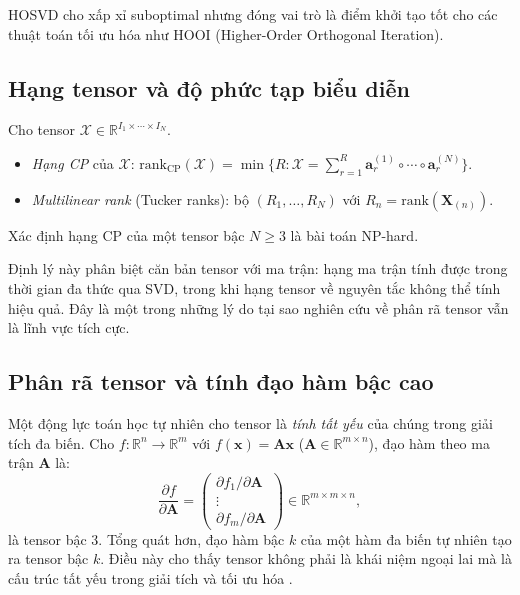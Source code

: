 HOSVD cho xấp xỉ suboptimal nhưng đóng vai trò là điểm khởi tạo tốt cho các thuật toán tối ưu hóa như HOOI (Higher-Order Orthogonal Iteration).

\subsection{Hạng tensor và độ phức tạp biểu diễn}

\begin{definition}
\label{def:rank-cp-tucker}
Cho tensor $\mathcal{X} \in \mathbb{R}^{I_1 \times \cdots \times I_N}$.
\begin{itemize}
  \item \textit{Hạng CP} của $\mathcal{X}$: $\mathrm{rank}_{\mathrm{CP}}(\mathcal{X}) = \min\{R : \mathcal{X} = \sum_{r=1}^R \mathbf{a}^{(1)}_r \circ \cdots \circ \mathbf{a}^{(N)}_r\}$.
  \item \textit{Multilinear rank} (Tucker ranks): bộ $(R_1,\ldots,R_N)$ với $R_n = \mathrm{rank}(\mathbf{X}_{(n)})$.
\end{itemize}
\end{definition}

\begin{theorem}
Xác định hạng CP của một tensor bậc $N \geq 3$ là bài toán NP-hard.
\end{theorem}

Định lý này phân biệt căn bản tensor với ma trận: hạng ma trận tính được trong thời gian đa thức qua SVD, trong khi hạng tensor về nguyên tắc không thể tính hiệu quả. Đây là một trong những lý do tại sao nghiên cứu về phân rã tensor vẫn là lĩnh vực tích cực.

\subsection{Phân rã tensor và tính đạo hàm bậc cao}

Một động lực toán học tự nhiên cho tensor là \textit{tính tất yếu} của chúng trong giải tích đa biến. Cho $f: \mathbb{R}^n \to \mathbb{R}^m$ với $f(\mathbf{x}) = \mathbf{A}\mathbf{x}$ ($\mathbf{A} \in \mathbb{R}^{m\times n}$), đạo hàm theo ma trận $\mathbf{A}$ là:
\begin{equation}
    \frac{\partial f}{\partial \mathbf{A}} =
    \begin{pmatrix} \partial f_1 / \partial \mathbf{A} \\ \vdots \\ \partial f_m / \partial \mathbf{A} \end{pmatrix}
    \in \mathbb{R}^{m \times m \times n},
\end{equation}
là tensor bậc 3. Tổng quát hơn, đạo hàm bậc $k$ của một hàm đa biến tự nhiên tạo ra tensor bậc $k$. Điều này cho thấy tensor không phải là khái niệm ngoại lai mà là cấu trúc tất yếu trong giải tích và tối ưu hóa \cite{chrysos2025tutorial}.

